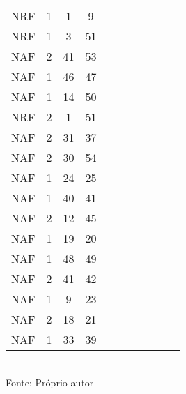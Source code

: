 \begin{table}[H]
{\begin{tabular}{ccccccccccc}
NRF & 1 & 1 & 9 &  &  &  &  &  &  &  \\
NRF & 1 & 3 & 51 &  &  &  &  &  &  &  \\
NAF & 2 & 41 & 53 &  &  &  &  &  &  &  \\
NAF & 1 & 46 & 47 &  &  &  &  &  &  &  \\
NAF & 1 & 14 & 50 &  &  &  &  &  &  &  \\
NRF & 2 & 1 & 51 &  &  &  &  &  &  &  \\
NAF & 2 & 31 & 37 &  &  &  &  &  &  &  \\
NAF & 2 & 30 & 54 &  &  &  &  &  &  &  \\
NAF & 1 & 24 & 25 &  &  &  &  &  &  &  \\
NAF & 1 & 40 & 41 &  &  &  &  &  &  &  \\
NAF & 2 & 12 & 45 &  &  &  &  &  &  &  \\
NAF & 1 & 19 & 20 &  &  &  &  &  &  &  \\
NAF & 1 & 48 & 49 &  &  &  &  &  &  &  \\
NAF & 2 & 41 & 42 &  &  &  &  &  &  &  \\
NAF & 1 & 9 & 23 &  &  &  &  &  &  &  \\
NAF & 2 & 18 & 21 &  &  &  &  &  &  &  \\
NAF & 1 & 33 & 39 &  &  &  &  &  &  &  \\
\bottomrule
\end{tabular}}
\\Fonte: Próprio autor
\end{table}


